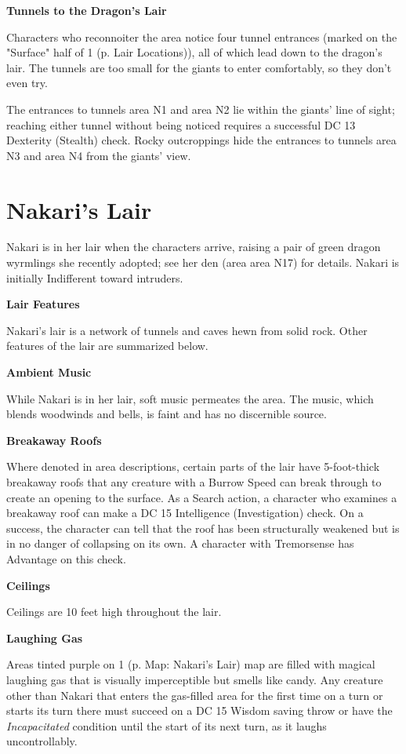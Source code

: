 \documentclass[letterpaper, 11pt, twocolumn]{dndbook}
\begin{document}
\textbf{Tunnels to the Dragon's Lair}

Characters who reconnoiter the area notice four tunnel entrances (marked on the "Surface" half of 1 (p. Lair Locations)), all of which lead down to the dragon's lair. The tunnels are too small for the giants to enter comfortably, so they don't even try.

The entrances to tunnels area N1 and area N2 lie within the giants' line of sight; reaching either tunnel without being noticed requires a successful DC 13 Dexterity (Stealth) check. Rocky outcroppings hide the entrances to tunnels area N3 and area N4 from the giants' view.
\section{Nakari's Lair}

Nakari is in her lair when the characters arrive, raising a pair of green dragon wyrmlings she recently adopted; see her den (area area N17) for details. Nakari is initially Indifferent toward intruders.

\textbf{Lair Features}

Nakari's lair is a network of tunnels and caves hewn from solid rock. Other features of the lair are summarized below.

\textbf{Ambient Music}

While Nakari is in her lair, soft music permeates the area. The music, which blends woodwinds and bells, is faint and has no discernible source.

\textbf{Breakaway Roofs}

Where denoted in area descriptions, certain parts of the lair have 5-foot-thick breakaway roofs that any creature with a Burrow Speed can break through to create an opening to the surface. As a Search action, a character who examines a breakaway roof can make a DC 15 Intelligence (Investigation) check. On a success, the character can tell that the roof has been structurally weakened but is in no danger of collapsing on its own. A character with Tremorsense has Advantage on this check.

\textbf{Ceilings}

Ceilings are 10 feet high throughout the lair.

\textbf{Laughing Gas}

Areas tinted purple on 1 (p. Map: Nakari's Lair) map are filled with magical laughing gas that is visually imperceptible but smells like candy. Any creature other than Nakari that enters the gas-filled area for the first time on a turn or starts its turn there must succeed on a DC 15 Wisdom saving throw or have the \textit{Incapacitated} condition until the start of its next turn, as it laughs uncontrollably.
\end{document}
